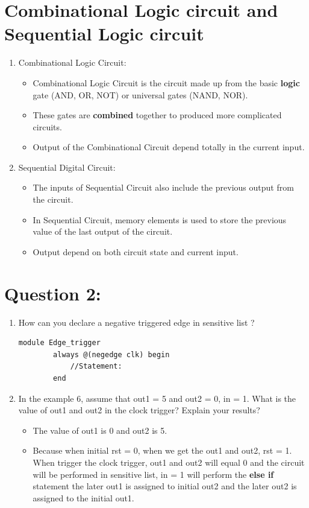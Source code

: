 \documentclass[12pt]{article}
\begin{document}
\section{Combinational Logic circuit and Sequential Logic circuit}
\begin{enumerate}
	\item Combinational Logic Circuit: \\
	\begin{itemize}
		\item Combinational Logic Circuit is the circuit made up from the basic \textbf{logic} gate (AND, OR, NOT) or universal gates (NAND, NOR).
		\item These gates are \textbf{combined} together to produced more complicated circuits.
		\item Output of the Combinational Circuit depend totally in the current input.
	\end{itemize}
	\item Sequential Digital Circuit: \\
	\begin{itemize}
		\item The inputs of Sequential Circuit also include the previous output from the circuit.
		\item In Sequential Circuit, memory elements is used to store the previous value of the last output of the circuit.
		\item Output depend on both circuit state and current input.
	\end{itemize}
\end{enumerate}
\section{Question 2: }
\begin{enumerate}
	\item How can you declare a negative triggered edge in sensitive list ? \\
	\begin{lstlisting}[style={verilog-style}]
		module Edge_trigger
		always @(negedge clk) begin
			//Statement:
		end
	\end{lstlisting}
	\item In the example 6, assume that out1 = 5 and out2 = 0, in = 1. What is the value of out1 and out2 in the clock trigger? Explain your results? \\
	 \begin{itemize}
	 	\item The value of out1 is 0 and out2 is 5.
	 	\item Because when initial rst = 0, when we get the out1 and out2, rst = 1. When trigger the clock trigger, out1 and out2 will equal 0 and the circuit will be performed in sensitive list, in = 1 will perform the \textbf{else if} statement the later out1 is assigned to initial out2 and the later out2 is assigned to the initial out1.
	 \end{itemize}
\end{enumerate}
\end{document}
